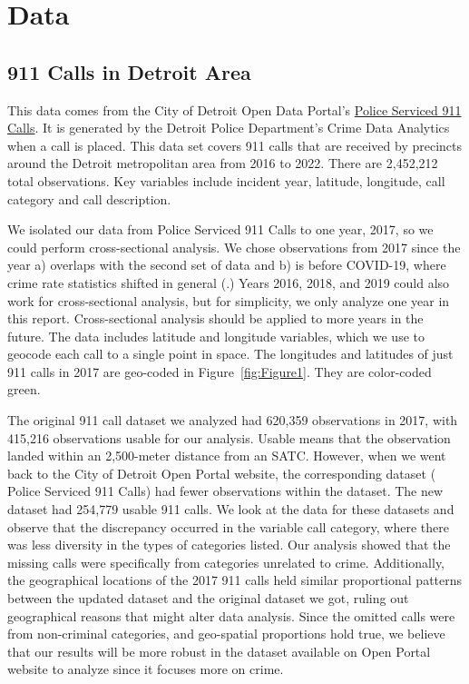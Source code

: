 \documentclass[12pt]{article}
\begin{document}
\section{Data}
\label{sec:data}

\subsection{911 Calls in Detroit Area}

This data comes from the City of Detroit Open Data Portal's   \href{https://data.detroitmi.gov/datasets/detroitmi::police-serviced-911-calls/about}{Police Serviced 911 Calls}. It is generated by the Detroit Police Department's Crime Data Analytics when a call is placed. This data set covers 911 calls that are received by precincts around the Detroit metropolitan area from 2016 to 2022. There are 2,452,212 total observations. Key variables include incident year, latitude, longitude, call category and call description. 

We isolated our data from Police Serviced 911 Calls to one year, 2017, so we could perform cross-sectional analysis. We chose observations from 2017 since the year a) overlaps with the second set of data and b) is before COVID-19, where crime rate statistics shifted in general (\citealp{covid_and_crime}.)  Years 2016, 2018, and 2019 could also work for cross-sectional analysis, but for simplicity, we only analyze one year in this report. Cross-sectional analysis should be applied to more years in the future. The data includes latitude and longitude variables, which we use to geocode each call to a single point in space. The longitudes and latitudes of just 911 calls in 2017 are geo-coded in Figure~\ref{fig:Figure1}. They are color-coded green. 

The original 911 call dataset we analyzed had 620,359 observations in 2017, with 415,216 observations usable for our analysis.  Usable means that the observation landed within an 2,500-meter distance from an SATC. However, when we went back to the City of Detroit Open Portal website, the corresponding dataset ( Police Serviced 911 Calls) had fewer observations within the dataset. The new dataset had 254,779 usable 911 calls. We look at the data for these datasets and observe that the discrepancy occurred in the variable call category, where there was less diversity in the types of categories listed. Our analysis showed that the missing calls were specifically from categories unrelated to crime.  Additionally, the geographical locations of the 2017 911 calls held similar proportional patterns between the updated dataset and the original dataset we got, ruling out geographical reasons that might alter data analysis. Since the omitted calls were from non-criminal categories, and geo-spatial proportions hold true, we believe that our results will be more robust in the dataset available on Open Portal website to analyze since it focuses more on crime.\footnotemark[1]
\end{document}
